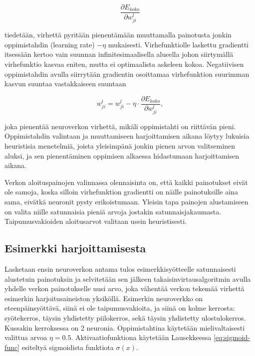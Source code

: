 \documentclass[finnish]{tktltiki2}
\theoremstyle{definition}
\theoremstyle{remark}
\begin{document}
  $$\frac{\partial E_{koko}}{\partial w_{ji}^{l}}$$
  
  \noindent tiedetään, virhettä pyritään pienentämään muuttamalla painotusta jonkin oppimistahdin (learning rate) $-\eta$ mukaisesti. Virhefunktiolle laskettu gradientti itsessään kertoo vain suunnan infinitesimaalisella alueella johon siirtymällä virhefunktio kasvaa eniten, mutta ei optimaalista askeleen kokoa. Negatiivisen oppimistahdin avulla siirrytään gradientin osoittamaa virhefunktion suurimman kasvun suuntaa vastakkaiseen suuntaan

  
  $$ w_{ji}^{l} = w_{ji}^{l} - \eta \cdot \frac{\partial E_{koko}}{\partial w_{ji}^{l}}, $$

  \noindent joka pienentää neuroverkon virhettä, mikäli oppimistahti on riittävän pieni. Oppimistahdin valintaan ja muuttamiseen harjoittamisen aikana löytyy lukuisia heuristisia menetelmiä, joista yleisimpänä jonkin pienen arvon valitseminen aluksi, ja sen pienentäminen oppimisen alkaessa hidastumaan harjoittamisen aikana. \cite{Goodfellow-et-al-2016}\cite{KSHimagenet2012}

  Verkon aloituspainojen valinnassa olennaisinta on, että kaikki painotukset eivät ole samoja, koska silloin virhefunktion gradientti on näille painotuksille aina sama, eivätkä neuronit pysty erikoistumaan. Yleisin tapa painojen alustamiseen on valita niille satunnaisia pieniä arvoja jostakin satunnaisjakaumasta. Taipumusvakioiden aloitusarvot valitaan usein heuristisesti. \cite{Goodfellow-et-al-2016}


  \subsection{Esimerkki harjoittamisesta}

  Lasketaan ensin neuroverkon antama tulos esimerkkisyötteelle satunnaisesti alustetuin painotuksin ja selvitetään sen jälkeen takaisinvirtausalgoritmin avulla yhdelle verkon painotukselle uusi arvo, joka vähentää verkon tekemää virhettä esimerkin harjoitusaineiston yksiköllä. Esimerkin neuroverkko on eteenpäinsyöttävä, siinä ei ole taipumusvakioita, ja siinä on kolme kerrosta: syötekerros, täysin yhdistetty piilokerros, sekä täysin yhdistetty ulostulokerros. Kussakin kerroksessa on 2 neuronia. Oppimistahtina käytetään mielivaltaisesti valittua arvoa $\eta = 0.5$.
   Aktivaatiofunktiona käytetään Lausekkeessa \ref{eq:sigmoid-func} esiteltyä sigmoidista funktiota $\sigma (x)$.
\end{document}
